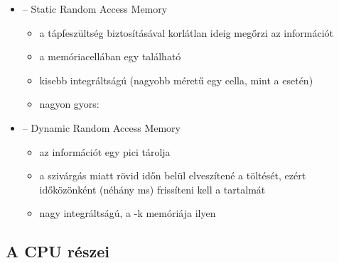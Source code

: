 \documentclass[../main.tex]{subfiles}
\begin{document}
\begin{itemize}
	\item {} \tabto{1.7cm} – \tabto{2.5cm}
	      Static Random Access Memory
	      \begin{itemize}
		      \item  a tápfeszültség biztosításával korlátlan
		            ideig megőrzi az információt

		      \item a memóriacellában egy  található

		      \item kisebb integráltságú
		            (nagyobb méretű egy cella, mint a  esetén)

		      \item nagyon gyors: 
	      \end{itemize}

	\item {} \tabto{1.7cm} – \tabto{2.5cm}
	      Dynamic Random Access Memory
	      \begin{itemize}
		      \item az információt egy pici
		             tárolja

		      \item a szivárgás miatt rövid időn belül elveszítené a töltését,
		            ezért időközönként (néhány ms) frissíteni kell a tartalmát

		      \item nagy integráltságú, a -k memóriája ilyen
	      \end{itemize}
\end{itemize}

\subsection{A CPU részei}
\end{document}
